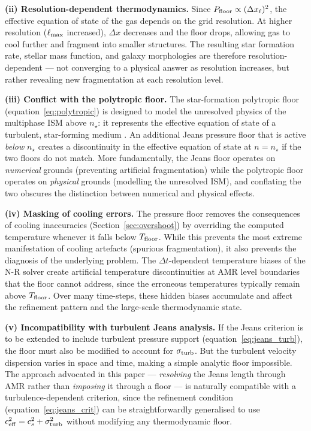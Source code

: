 \documentclass[fleqn,usenatbib]{mnras}
\newcommand{\nstar}{n_\star}
\newcommand{\dx}{\Delta x}
\begin{document}
\textbf{(ii) Resolution-dependent thermodynamics.}
Since $P_{\rm floor} \propto (\dx_\ell)^2$, the effective equation
of state of the gas depends on the grid resolution.  At higher
resolution ($\ell_{\rm max}$ increased), $\dx$ decreases and the floor
drops, allowing gas to cool further and fragment into smaller
structures.  The resulting star formation rate, stellar mass function,
and galaxy morphologies are therefore resolution-dependent --- not
converging to a physical answer as resolution increases, but rather
revealing new fragmentation at each resolution level.

\textbf{(iii) Conflict with the polytropic floor.}
The star-formation polytropic floor (equation~\ref{eq:polytropic}) is
designed to model the unresolved physics of the multiphase ISM above
$\nstar$: it represents the effective equation of state of a turbulent,
star-forming medium \citep{Schaye2015}.  An additional Jeans pressure
floor that is active \emph{below} $\nstar$ creates a discontinuity in
the effective equation of state at $n = \nstar$ if the two floors do
not match.  More fundamentally, the Jeans floor operates on
\emph{numerical} grounds (preventing artificial fragmentation) while
the polytropic floor operates on \emph{physical} grounds (modelling
the unresolved ISM), and conflating the two obscures the distinction
between numerical and physical effects.

\textbf{(iv) Masking of cooling errors.}
The pressure floor removes the consequences of cooling inaccuracies
(Section~\ref{sec:overshoot}) by overriding the computed temperature
whenever it falls below $T_{\rm floor}$.  While this prevents the
most extreme manifestation of cooling artefacts (spurious
fragmentation), it also prevents the diagnosis of the underlying
problem.  The $\Delta t$-dependent temperature biases of the N-R
solver create artificial temperature discontinuities at AMR level
boundaries that the floor cannot address, since the erroneous
temperatures typically remain above $T_{\rm floor}$.  Over many
time-steps, these hidden biases accumulate and affect the refinement
pattern and the large-scale thermodynamic state.

\textbf{(v) Incompatibility with turbulent Jeans analysis.}
If the Jeans criterion is to be extended to include turbulent pressure
support (equation~\ref{eq:jeans_turb}), the floor must also be
modified to account for $\sigma_{\rm turb}$.  But the turbulent
velocity dispersion varies in space and time, making a simple analytic
floor impossible.  The approach advocated in this paper --- \emph{resolving}
the Jeans length through AMR rather than \emph{imposing} it through a
floor --- is naturally compatible with a turbulence-dependent criterion,
since the refinement condition (equation~\ref{eq:jeans_crit}) can be
straightforwardly generalised to use $c_{\rm eff}^2 = c_s^2 +
\sigma_{\rm turb}^2$ without modifying any thermodynamic floor.
\end{document}
